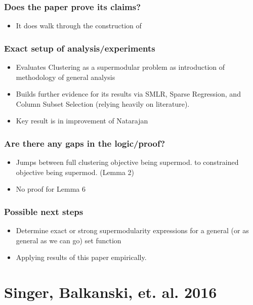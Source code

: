 \documentclass{article}
\begin{document}
\subsubsection*{Does the paper prove its claims?}
\begin{itemize}
\item It does walk through the construction of 
\end{itemize}

\subsubsection*{Exact setup of analysis/experiments}
\begin{itemize}
\item Evaluates Clustering as a supermodular problem as introduction of methodology of general analysis
\item Builds further evidence for its results via SMLR, Sparse Regression, and Column Subset Selection (relying heavily on literature).
\item Key result is in improvement of Natarajan
\end{itemize}

\subsubsection*{Are there any gaps in the logic/proof?}
\begin{itemize}
\item Jumps between full clustering objective being supermod. to constrained objective being supermod. (Lemma 2)
\item No proof for Lemma 6
\end{itemize}

\subsubsection*{Possible next steps}
\begin{itemize}
\item Determine exact or strong supermodularity expressions for a general (or as general as we can go) set function
\item Applying results of this paper empirically.
\end{itemize}
\newpage
\section{Singer, Balkanski, et. al. 2016}
\end{document}
